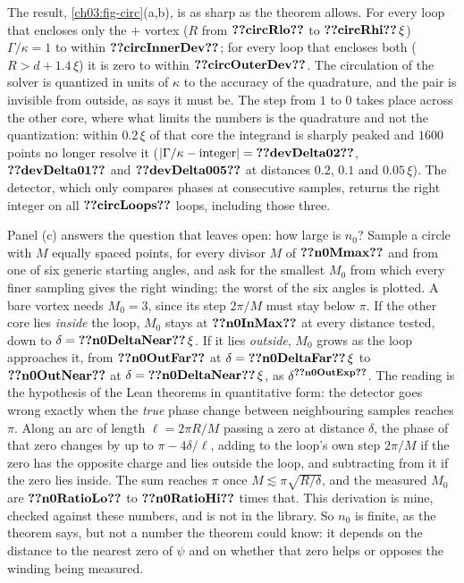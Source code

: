 The result, \cref{ch03:fig-circ}(a,b), is as sharp as the theorem allows. For every loop that encloses only the $+$ vortex ($R$ from $\cthreeNum{circRlo}$ to $\cthreeNum{circRhi}\,\xi$) $\Gamma/\kappa=1$ to within $\cthreeNum{circInnerDev}$; for every loop that encloses both ($R>d+1.4\,\xi$) it is zero to within $\cthreeNum{circOuterDev}$. The circulation of the solver is quantized in units of $\kappa$ to the accuracy of the quadrature, and the pair is invisible from outside, as  says it must be. The step from $1$ to $0$ takes place across the other core, where what limits the numbers is the quadrature and not the quantization: within $0.2\,\xi$ of that core the integrand is sharply peaked and $1600$ points no longer resolve it ($|\Gamma/\kappa-\text{integer}|=\cthreeNum{devDelta02}$, $\cthreeNum{devDelta01}$ and $\cthreeNum{devDelta005}$ at distances $0.2$, $0.1$ and $0.05\,\xi$). The detector, which only compares phases at consecutive samples, returns the right integer on all $\cthreeNum{circLoops}$ loops, including those three.

Panel (c) answers the question that  leaves open: how large is $n_0$? Sample a circle with $M$ equally spaced points, for every divisor $M$ of $\cthreeNum{n0Mmax}$ and from one of six generic starting angles, and ask for the smallest $M_0$ from which every finer sampling gives the right winding; the worst of the six angles is plotted. A bare vortex needs $M_0=3$, since its step $2\pi/M$ must stay below $\pi$. If the other core lies \emph{inside} the loop, $M_0$ stays at $\cthreeNum{n0InMax}$ at every distance tested, down to $\delta=\cthreeNum{n0DeltaNear}\,\xi$. If it lies \emph{outside}, $M_0$ grows as the loop approaches it, from $\cthreeNum{n0OutFar}$ at $\delta=\cthreeNum{n0DeltaFar}\,\xi$ to $\cthreeNum{n0OutNear}$ at $\delta=\cthreeNum{n0DeltaNear}\,\xi$, as $\delta^{\cthreeNum{n0OutExp}}$. The reading is the hypothesis of the Lean theorems in quantitative form: the detector goes wrong exactly when the \emph{true} phase change between neighbouring samples reaches $\pi$. Along an arc of length $\ell=2\pi R/M$ passing a zero at distance $\delta$, the phase of that zero changes by up to $\pi-4\delta/\ell$, adding to the loop's own step $2\pi/M$ if the zero has the opposite charge and lies outside the loop, and subtracting from it if the zero lies inside. The sum reaches $\pi$ once $M\lesssim\pi\sqrt{R/\delta}$, and the measured $M_0$ are $\cthreeNum{n0RatioLo}$ to $\cthreeNum{n0RatioHi}$ times that. This derivation is mine, checked against these numbers, and is not in the library. So $n_0$ is finite, as the theorem says, but not a number the theorem could know: it depends on the distance to the nearest zero of $\psi$ and on whether that zero helps or opposes the winding being measured.

